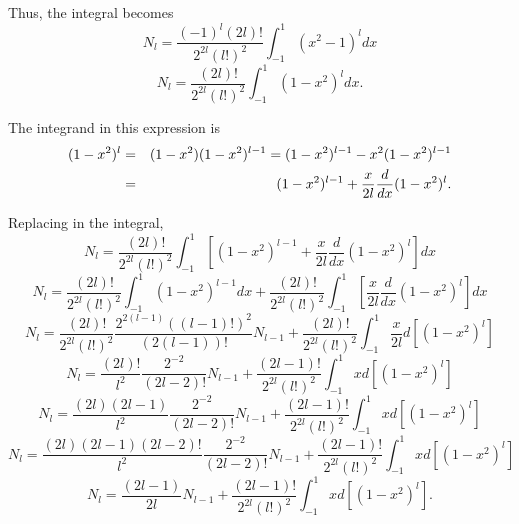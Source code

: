 Thus, the integral becomes
\begin{equation}
N_l  = \frac{(-1)^l (2l)!}{2^{2l} (l!)^2} \int_{-1}^{1} (x^2 - 1)^l  dx
\end{equation}
\begin{equation}
N_l  = \frac{(2l)!}{2^{2l} (l!)^2} \int_{-1}^{1} ( 1 - x^2 )^l dx.
\end{equation}

The integrand in this expression is
\begin{eqnarray}
( 1 - x^2 )^l  &=& ( 1 - x^2 )( 1 - x^2 )^{l-1} = ( 1 - x^2 )^{l-1} - x^2 ( 1 - x^2 )^{l-1} \notag \\
 &=& ( 1 - x^2 )^{l-1}  + \frac{x}{2l} \frac{d}{dx} ( 1 - x^2 )^{l} .
\end{eqnarray}

Replacing in the integral,
\begin{equation}
N_l  = \frac{(2l)!}{2^{2l} (l!)^2} \int_{-1}^{1} \left[ ( 1 - x^2 )^{l-1}  + \frac{x}{2l} \frac{d}{dx} ( 1 - x^2 )^{l}  \right] dx
\end{equation}
\begin{equation}
N_l  = \frac{(2l)!}{2^{2l} (l!)^2} \int_{-1}^{1} ( 1 - x^2 )^{l-1} dx  + \frac{(2l)!}{2^{2l} (l!)^2} \int_{-1}^{1}  \left[  \frac{x}{2l} \frac{d}{dx} ( 1 - x^2 )^{l}  \right] dx
\end{equation}
\begin{equation}
N_l  = \frac{(2l)!}{2^{2l} (l!)^2} \frac{2^{2(l-1)} ((l-1)!)^2}{(2(l-1))!} N_{l-1}  + \frac{(2l)!}{2^{2l} (l!)^2} \int_{-1}^{1}   \frac{x}{2l} d\left[( 1 - x^2 )^{l}  \right] 
\end{equation}
\begin{equation}
N_l  = \frac{(2l)!}{ l^2} \frac{2^{-2} }{(2l-2)!} N_{l-1}  + \frac{(2l-1)!}{2^{2l} (l!)^2} \int_{-1}^{1}  xd\left[( 1 - x^2 )^{l}  \right] 
\end{equation}
\begin{equation}
N_l  = \frac{(2l)(2l-1)}{ l^2} \frac{2^{-2} }{(2l-2)!} N_{l-1}  + \frac{(2l-1)!}{2^{2l} (l!)^2} \int_{-1}^{1}  xd\left[( 1 - x^2 )^{l}  \right] 
\end{equation}
\begin{equation}
N_l  = \frac{(2l)(2l-1)(2l-2)!}{ l^2} \frac{2^{-2} }{(2l-2)!} N_{l-1}  + \frac{(2l-1)!}{2^{2l} (l!)^2} \int_{-1}^{1}  xd\left[( 1 - x^2 )^{l}  \right] 
\end{equation}
\begin{equation}
N_l  = \frac{(2l-1)}{2 l} N_{l-1}  + \frac{(2l-1)!}{2^{2l} (l!)^2} \int_{-1}^{1}  xd\left[( 1 - x^2 )^{l}  \right] .
\end{equation}

